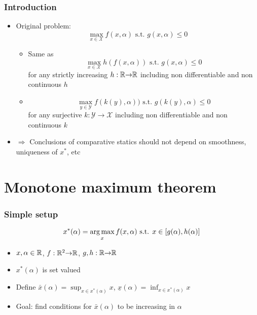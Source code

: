 \begin{frame}\frametitle{Introduction}
  \begin{itemize}
  \item Original problem:
    \[ \max_{x \in \mathcal{X}} f(x,\alpha) \text{ s.t. }
    g(x,\alpha) \leq 0 \]
    \begin{itemize}
    \item Same as
      \[ \max_{x \in \mathcal{X}} h(f(x,\alpha)) \text{ s.t. } g(x,\alpha) \leq 0 \]  
      for any strictly increasing $h:\mathbb{R} {\rightarrow} \mathbb{R}$ including non differentiable
      and non continuous $h$
    \item \[ \max_{y \in \mathcal{Y}} f(k(y),\alpha)) \text{ s.t. }
      g(k(y),\alpha) \leq 0 \]   
      for any surjective $k:\mathcal{Y} \to \mathcal{X}$
      including non differentiable and non continuous $k$
    \end{itemize}
  \item $\Rightarrow$ Conclusions of comparative statics should not
    depend on smoothness, uniqueness of $x^*$, etc
  \end{itemize}
\end{frame}

\section{Monotone maximum theorem}

\begin{frame} \frametitle{Simple setup}
  \[ x^*(\alpha) = \argmax_x f(x,\alpha) \text{ s.t. } x \in
  [g(\alpha),h(\alpha)] \] 
  \begin{itemize}
  \item $x, \alpha \in \mathbb{R}$, $f:\mathbb{R}^2 {\rightarrow} \mathbb{R}$, $g, h:\mathbb{R} {\rightarrow} \mathbb{R}$
  \item $x^*(\alpha)$ is set valued
  \item Define $\bar{x}(\alpha) = \sup_{x \in x^*(\alpha)} x$,
    $\underline{x}(\alpha) = \inf_{x \in x^*(\alpha)} x$ 
  \item Goal: find conditions for $\bar{x}(\alpha)$ to be increasing
    in $\alpha$
  \end{itemize}
\end{frame}

